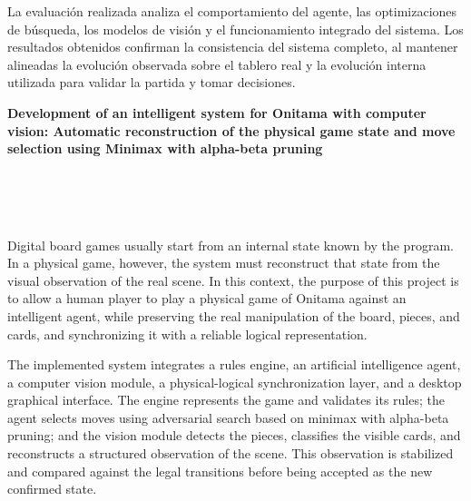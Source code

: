 La evaluación realizada analiza el comportamiento del agente, las optimizaciones de búsqueda, los modelos de visión y el funcionamiento integrado del sistema. Los resultados obtenidos confirman la consistencia del sistema completo, al mantener alineadas la evolución observada sobre el tablero real y la evolución interna utilizada para validar la partida y tomar decisiones.



\cleardoublepage
\thispagestyle{empty}

\begin{center}
{\large\bfseries Development of an intelligent system for Onitama with computer vision: Automatic reconstruction of the physical game state and move selection using Minimax with alpha-beta pruning}\\
\end{center}

\begin{center}
\myName\\
\end{center}

\\

\vspace{0.7cm}
\\

Digital board games usually start from an internal state known by the program. In a physical game, however, the system must reconstruct that state from the visual observation of the real scene. In this context, the purpose of this project is to allow a human player to play a physical game of Onitama against an intelligent agent, while preserving the real manipulation of the board, pieces, and cards, and synchronizing it with a reliable logical representation.

The implemented system integrates a rules engine, an artificial intelligence agent, a computer vision module, a physical-logical synchronization layer, and a desktop graphical interface. The engine represents the game and validates its rules; the agent selects moves using adversarial search based on minimax with alpha-beta pruning; and the vision module detects the pieces, classifies the visible cards, and reconstructs a structured observation of the scene. This observation is stabilized and compared against the legal transitions before being accepted as the new confirmed state.

